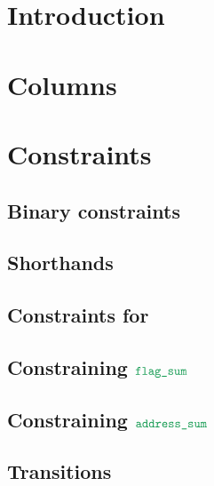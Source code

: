 \section{Introduction}                                                      \label{bls: intro}                                              
\section{Columns}                                                           \label{bls: columns}                                            

\section{Constraints}    
\subsection{Binary constraints}                                             \label{bls: binary}                                             
\subsection{Shorthands}                                                     \label{bls: shorthands}                                         
\subsection{Constraints for \blsStamp{}}                                    \label{bls: stamp}                                              
\subsection{Constraining $\locFlagSum$}                                     \label{bls: flag sum}                                           
\subsection{Constraining $\locAddressSum$}                                  \label{bls: address sum}                                        
\subsection{Transitions}                                                    \label{bls: transitions}                                        
